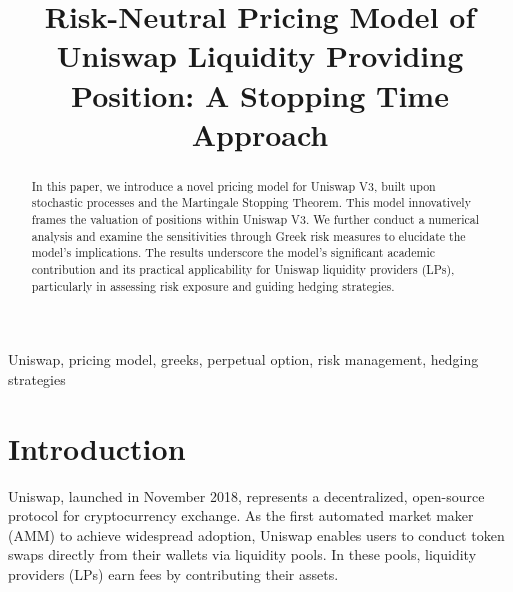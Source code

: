 \documentclass[conference]{IEEEtran}
\begin{document}
\title{Risk-Neutral Pricing Model of Uniswap Liquidity Providing Position: A Stopping Time Approach\\}

\author{
\and
{}
\and
{}
}

\maketitle

\begin{abstract}
In this paper, we introduce a novel pricing model for Uniswap V3, built upon stochastic processes and the Martingale Stopping Theorem. This model innovatively frames the valuation of positions within Uniswap V3. We further conduct a numerical analysis and examine the sensitivities through Greek risk measures to elucidate the model's implications. The results underscore the model’s significant academic contribution and its practical applicability for Uniswap liquidity providers (LPs), particularly in assessing risk exposure and guiding hedging strategies.
\end{abstract}

\begin{IEEEkeywords}
Uniswap, pricing model, greeks, perpetual option, risk management, hedging strategies
\end{IEEEkeywords}

\section{Introduction}
Uniswap\cite{b1}, launched in November 2018, represents a decentralized, open-source protocol for cryptocurrency exchange. As the first automated market maker (AMM) to achieve widespread adoption, Uniswap enables users to conduct token swaps directly from their wallets via liquidity pools. In these pools, liquidity providers (LPs) earn fees by contributing their assets.
\end{document}
